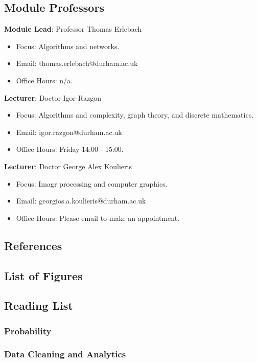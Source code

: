 \subsection{Module Professors}

\textbf{Module Lead}: Professor Thomas Erlebach

\begin{itemize}\label{modulelead-thomaserleback}
    \item Focus: Algorithms and networks.
    \item Email: thomas.erlebach@durham.ac.uk
    \item Office Hours: n/a.
\end{itemize}

\textbf{Lecturer}: Doctor Igor Razgon

\begin{itemize}\label{lecturer-igorrazgon}
    \item Focus: Algorithms and complexity, graph theory, and discrete mathematics.
    \item Email: igor.razgon@durham.ac.uk
    \item Office Hours: Friday 14:00 - 15:00.
\end{itemize}

\textbf{Lecturer}: Doctor George Alex Koulieris

\begin{itemize}\label{lecturer-georgekoulieris}
    \item Focus: Imagr processing and computer graphics.
    \item Email: georgios.a.koulieris@durham.ac.uk
    \item Office Hours: Please email to make an appointment.
\end{itemize}

\subsection{References}

\subsection{List of Figures}

\subsection{Reading List}

\subsubsection{Probability}


\subsubsection{Data Cleaning and Analytics}

